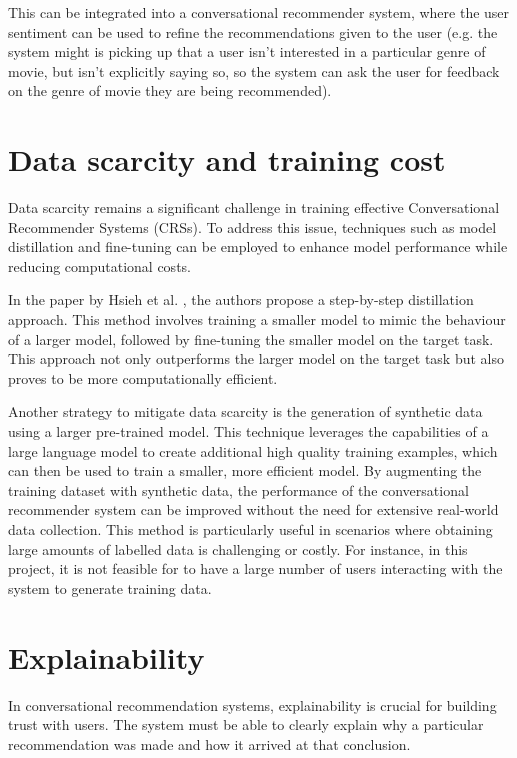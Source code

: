 This can be integrated into a conversational recommender system, where the user sentiment can be used to refine the recommendations given to the user (e.g. the system might is picking up that a user isn't interested in a particular genre of movie, but isn't explicitly saying so, so the system can ask the user for feedback on the genre of movie they are being recommended).


\section{Data scarcity and training cost}
Data scarcity remains a significant challenge in training effective Conversational Recommender Systems (CRSs). To address this issue, techniques such as model distillation and fine-tuning can be employed to enhance model performance while reducing computational costs.

In the paper by Hsieh et al. \cite{hsieh2023distillingstepbystepoutperforminglarger}, the authors propose a step-by-step distillation approach. This method involves training a smaller model to mimic the behaviour of a larger model, followed by fine-tuning the smaller model on the target task. This approach not only outperforms the larger model on the target task but also proves to be more computationally efficient.

Another strategy to mitigate data scarcity is the generation of synthetic data using a larger pre-trained model. 
This technique leverages the capabilities of a large language model to create additional high quality training examples, 
which can then be used to train a smaller, more efficient model. 
By augmenting the training dataset with synthetic data, the performance of the conversational recommender system can be improved without the need for extensive real-world data collection. 
This method is particularly useful in scenarios where obtaining large amounts of labelled data is challenging or costly. 
For instance, in this project, it is not feasible for to have a large number of users interacting with the system to generate training data.

\section{Explainability}
In conversational recommendation systems, explainability is crucial for building trust with users. The system must be able to clearly explain why a particular recommendation was made and how it arrived at that conclusion. 

